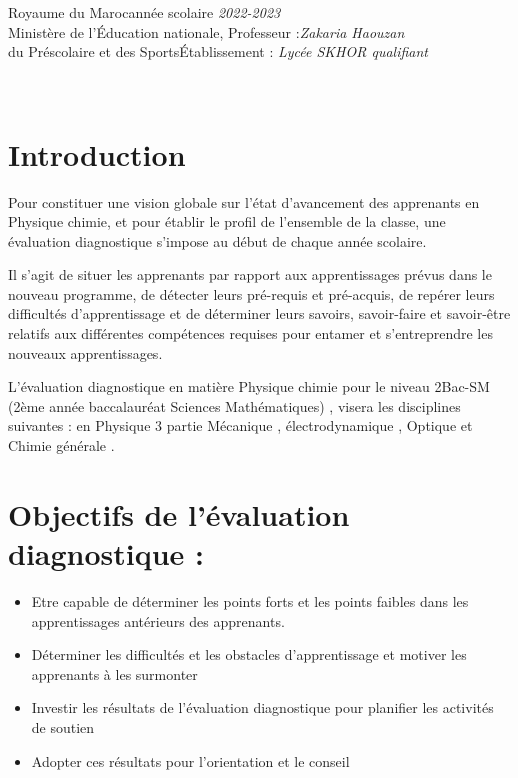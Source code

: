 \documentclass[12pt]{article}
\newcommand\headerMe[2]{\noindent{}#1\hfill#2}
\begin{document}
\headerMe{Royaume du Maroc}{année scolaire \emph{2022-2023}}\\
\headerMe{Ministère de l'Éducation nationale, }{  Professeur :\emph{Zakaria Haouzan}}\\
\headerMe{du Préscolaire et des Sports}{Établissement : \emph{Lycée SKHOR qualifiant}}\\

\begin{center}
\hrulefill
{}
\hrulefill\\
\end{center}


\section[A]{Introduction }
\hspace{0.5cm} Pour constituer une vision globale sur l’état d’avancement des apprenants en Physique chimie, et pour établir le profil de l’ensemble de la classe, une évaluation diagnostique s’impose au début de chaque année scolaire.

Il s’agit de situer les apprenants par rapport aux apprentissages prévus dans le nouveau programme, de détecter leurs pré-requis et pré-acquis, de repérer leurs difficultés d’apprentissage et de déterminer leurs savoirs, savoir-faire et savoir-être relatifs aux différentes compétences requises pour entamer et s’entreprendre les nouveaux apprentissages.

L’évaluation diagnostique en matière Physique chimie pour le niveau 2Bac-SM (2ème année baccalauréat Sciences Mathématiques) , visera les disciplines suivantes : en Physique 3 partie Mécanique , électrodynamique , Optique et Chimie générale .
\section{ Objectifs de l’évaluation diagnostique :}
\begin{itemize}
	\item Etre capable de déterminer les points forts et les points faibles dans les apprentissages antérieurs des apprenants.
	\item Déterminer les difficultés et les obstacles d’apprentissage et motiver les apprenants à les surmonter

	\item Investir les résultats de l’évaluation diagnostique pour planifier les activités de soutien
	\item Adopter ces résultats pour l’orientation et le conseil 

\end{itemize}
\end{document}
